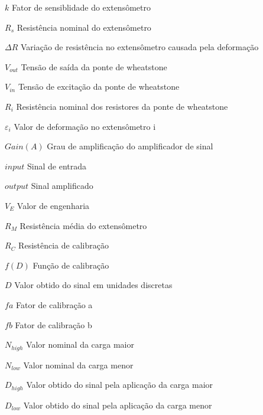\begin{simbolos}
    \item[$ k $] {Fator de sensiblidade do extensômetro}
    \item[$ R_s $] {Resistência nominal do extensômetro}
    \item[$ \Delta R $] {Variação de resistência no extensômetro causada pela deformação}

    \item[$ V_{out} $] {Tensão de saída da ponte de wheatstone}
    \item[$ V_{in} $] {Tensão de excitação da ponte de wheatstone}
    \item[$ R_i $] {Resistência nominal dos resistores da ponte de wheatstone}

    \item[$ \varepsilon_{i} $] {Valor de deformação no extensômetro i}

    \item[$ Gain(A) $] {Grau de amplificação do amplificador de sinal}
    \item[$ input $] {Sinal de entrada}
    \item[$ output $] {Sinal amplificado}

%
%

    \item[$ V_{E} $] {Valor de engenharia}
    \item[$ R_{M} $] {Resistência média do extensômetro}
    \item[$ R_{C} $] {Resistência de calibração}

    \item[$ f(D) $] {Função de calibração}
    \item[$ D $] {Valor obtido do sinal em unidades discretas}
    \item[$ fa $] {Fator de calibração a}
    \item[$ fb $] {Fator de calibração b}

    \item[$ N_{high} $] {Valor nominal da carga maior}
    \item[$ N_{low} $] {Valor nominal da carga menor}
    \item[$ D_{high} $] {Valor obtido do sinal pela aplicação da carga maior}
    \item[$ D_{low} $] {Valor obtido do sinal pela aplicação da carga menor}


\end{simbolos}

